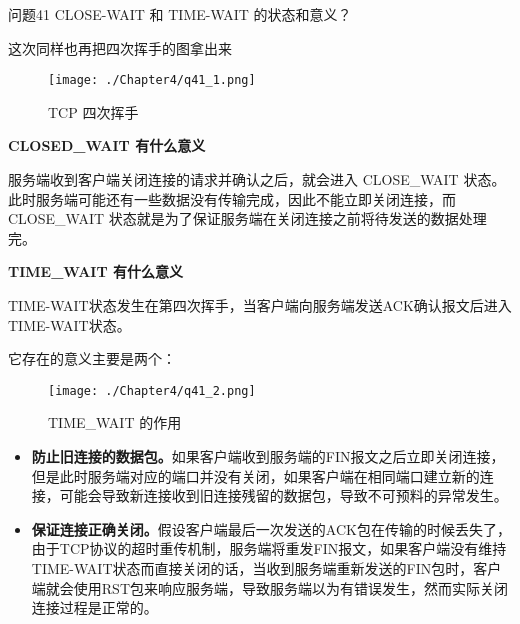 \documentclass[cn,11pt,color=blue,lang=cn]{elegantbook}
\begin{document}
\begin{custom}{问题41}
CLOSE-WAIT 和 TIME-WAIT 的状态和意义？
\end{custom}

\begin{solution}
这次同样也再把四次挥手的图拿出来
\begin{figure}[htbp]
\centering
\texttt{[image: ./Chapter4/q41\_1.png]}
\caption{TCP 四次挥手}
\end{figure}

\begin{note} \textbf{CLOSED\_WAIT 有什么意义} \end{note}

服务端收到客户端关闭连接的请求并确认之后，就会进入 CLOSE\_WAIT 状态。此时服务端可能还有一些数据没有传输完成，因此不能立即关闭连接，而 CLOSE\_WAIT 状态就是为了保证服务端在关闭连接之前将待发送的数据处理完。
\begin{note} \textbf{TIME\_WAIT 有什么意义} \end{note}

TIME-WAIT状态发生在第四次挥手，当客户端向服务端发送ACK确认报文后进入TIME-WAIT状态。

它存在的意义主要是两个：
\begin{figure}[htbp]
\centering
\texttt{[image: ./Chapter4/q41\_2.png]}
\caption{TIME\_WAIT 的作用}
\end{figure}

\begin{itemize}
	\item \textbf{防⽌旧连接的数据包。}如果客户端收到服务端的FIN报文之后立即关闭连接，但是此时服务端对应的端口并没有关闭，如果客户端在相同端口建立新的连接，可能会导致新连接收到旧连接残留的数据包，导致不可预料的异常发生。
	\item \textbf{保证连接正确关闭。}假设客户端最后一次发送的ACK包在传输的时候丢失了，由于TCP协议的超时重传机制，服务端将重发FIN报文，如果客户端没有维持TIME-WAIT状态而直接关闭的话，当收到服务端重新发送的FIN包时，客户端就会使用RST包来响应服务端，导致服务端以为有错误发生，然而实际关闭连接过程是正常的。
\end{itemize}

\end{solution}
\end{document}
